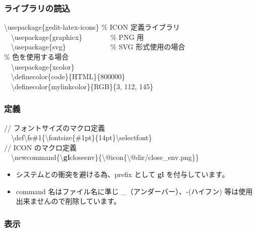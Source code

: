 \documentclass[10pt]{ltjarticle}
\begin{document}
\subsubsection{ライブラリの読込}
{\textbackslash}usepackage\{gedit-latex-icons\} \% ICON 定義ライブラリ \\ 
　{\textbackslash}usepackage\{graphicx\}　　　　\% PNG 用\\ 
　{\textbackslash}usepackage\{svg\} 　　　　　　\% SVG 形式使用の場合\\ 

\% 色を使用する場合\\
　{\textbackslash}usepackage\{xcolor\}\\
　{\textbackslash}definecolor\{code\}\{HTML\}\{800000\}\\
　{\textbackslash}definecolor\{mylinkcolor\}\{RGB\}\{3, 112, 145\}

\subsubsection{定義}
// フォントサイズのマクロ定義　\\
　{\textbackslash}def{\textbackslash}fs\#1\{{\textbackslash}fontsize\{\#1pt\}\{14pt\}{\textbackslash}selectfont\}\\

// ICON のマクロ定義\\
　{\textbackslash}newcommand\{{\textbackslash}\textbf{gl}closeenv\}\{{\textbackslash}@icon\{{\textbackslash}@dir/close\_env.png\}\}\\
\begin{itemize}\vspace{-6mm}
  \item システムとの衝突を避ける為、prefix として \textbf{gl} を付与しています。
\vspace{-3mm}
　\item command 名はファイル名に準じ \_（アンダーバー）、-(ハイフン) 等は使用出来ませんので削除しています。
\end{itemize}

\subsubsection{表示}
\end{document}
